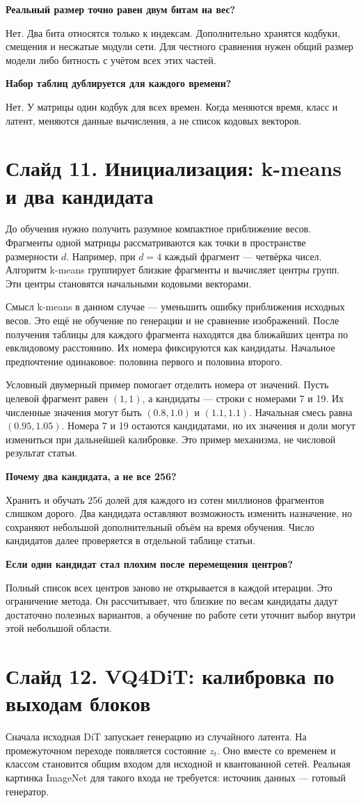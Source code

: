 \documentclass[a4paper,11pt]{article}
\newcommand{\slide}[2]{\clearpage\section*{Слайд #1. #2}}
\newcommand{\question}[1]{\par\textbf{#1}\par}
\begin{document}
\question{Реальный размер точно равен двум битам на вес?}
Нет. Два бита относятся только к индексам. Дополнительно хранятся
кодбуки, смещения и несжатые модули сети. Для честного сравнения
нужен общий размер модели либо битность с учётом всех этих частей.

\question{Набор таблиц дублируется для каждого времени?}
Нет. У матрицы один кодбук для всех времен. Когда меняются время,
класс и латент, меняются данные вычисления, а не список кодовых векторов.

\slide{11}{Инициализация: k-means и два кандидата}
До обучения нужно получить разумное компактное приближение весов.
Фрагменты одной матрицы рассматриваются как точки в пространстве
размерности $d$. Например, при $d=4$ каждый фрагмент --- четвёрка чисел.
Алгоритм k-means группирует близкие фрагменты и вычисляет центры групп.
Эти центры становятся начальными кодовыми векторами.

Смысл k-means в данном случае --- уменьшить ошибку приближения исходных
весов. Это ещё не обучение по генерации и не сравнение изображений.
После получения таблицы для каждого фрагмента находятся два ближайших
центра по евклидовому расстоянию. Их номера фиксируются как кандидаты.
Начальное предпочтение одинаковое: половина первого и половина второго.

Условный двумерный пример помогает отделить номера от значений.
Пусть целевой фрагмент равен $(1,1)$, а кандидаты --- строки с номерами
7 и 19. Их численные значения могут быть $(0.8,1.0)$ и $(1.1,1.1)$.
Начальная смесь равна $(0.95,1.05)$. Номера 7 и 19 остаются кандидатами,
но их значения и доли могут измениться при дальнейшей калибровке.
Это пример механизма, не числовой результат статьи.

\question{Почему два кандидата, а не все 256?}
Хранить и обучать 256 долей для каждого из сотен миллионов фрагментов
слишком дорого. Два кандидата оставляют возможность изменить назначение,
но сохраняют небольшой дополнительный объём на время обучения.
Число кандидатов далее проверяется в отдельной таблице статьи.

\question{Если один кандидат стал плохим после перемещения центров?}
Полный список всех центров заново не открывается в каждой итерации.
Это ограничение метода. Он рассчитывает, что близкие по весам кандидаты
дадут достаточно полезных вариантов, а обучение по работе сети
уточнит выбор внутри этой небольшой области.

\slide{12}{VQ4DiT: калибровка по выходам блоков}
Сначала исходная DiT запускает генерацию из случайного латента.
На промежуточном переходе появляется состояние $z_t$.
Оно вместе со временем и классом становится общим входом для
исходной и квантованной сетей. Реальная картинка ImageNet
для такого входа не требуется: источник данных --- готовый генератор.
\end{document}
